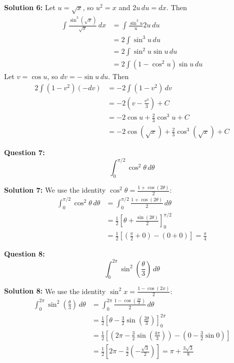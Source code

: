 \documentclass{article}
\begin{document}
\textbf{Solution 6:}
\textcolor[rgb]{1.000, 0.000, 0.000}{Let $u = \sqrt{x}$, so $u^2 = x$ and $2u \, du = dx$. Then
\begin{align*} \int \frac{\sin^3 (\sqrt{x})}{\sqrt{x}} \, dx &= \int \frac{\sin^3 u}{u} 2u \, du \\ &= 2 \int \sin^3 u \, du \\ &= 2 \int \sin^2 u \sin u \, du \\ &= 2 \int (1 - \cos^2 u) \sin u \, du \end{align*} 
Let $v = \cos u$, so $dv = -\sin u \, du$. Then
\begin{align*} 2 \int (1 - v^2) (-dv) &= -2 \int (1 - v^2) \, dv \\ &= -2 (v - \frac{v^3}{3}) + C \\ &= -2 \cos u + \frac{2}{3} \cos^3 u + C \\ &= -2 \cos (\sqrt{x}) + \frac{2}{3} \cos^3 (\sqrt{x}) + C \end{align*} }

\bigskip

\textbf{Question 7:}
\[ \int_0^{\pi/2} \cos^2 \theta \, d\theta \]

\textbf{Solution 7:}
\textcolor[rgb]{1.000, 0.000, 0.000}{We use the identity $\cos^2 \theta = \frac{1 + \cos(2\theta)}{2}$:
\begin{align*} \int_0^{\pi/2} \cos^2 \theta \, d\theta &= \int_0^{\pi/2} \frac{1 + \cos(2\theta)}{2} \, d\theta \\ &= \frac{1}{2} \left[ \theta + \frac{\sin(2\theta)}{2} \right]_0^{\pi/2} \\ &= \frac{1}{2} \left[ \left( \frac{\pi}{2} + 0 \right) - (0 + 0) \right] = \frac{\pi}{4} \end{align*} }

\bigskip

\textbf{Question 8:}
\[ \int_0^{2\pi} \sin^2 \left( \frac{\theta}{3} \right) \, d\theta \]

\textbf{Solution 8:}
\textcolor[rgb]{1.000, 0.000, 0.000}{We use the identity $\sin^2 x = \frac{1 - \cos(2x)}{2}$:
\begin{align*} \int_0^{2\pi} \sin^2 \left( \frac{\theta}{3} \right) \, d\theta &= \int_0^{2\pi} \frac{1 - \cos \left( \frac{2\theta}{3} \right)}{2} \, d\theta \\ &= \frac{1}{2} \left[ \theta - \frac{3}{2} \sin \left( \frac{2\theta}{3} \right) \right]_0^{2\pi} \\ &= \frac{1}{2} \left[ \left( 2\pi - \frac{3}{2} \sin \left( \frac{4\pi}{3} \right) \right) - \left( 0 - \frac{3}{2} \sin 0 \right) \right] \\ &= \frac{1}{2} \left[ 2\pi - \frac{3}{2} \left( -\frac{\sqrt{3}}{2} \right) \right] = \pi + \frac{3\sqrt{3}}{8} \end{align*} }
\end{document}
